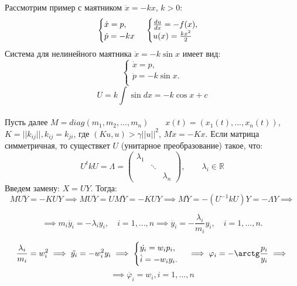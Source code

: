 \begin{example}
	Рассмотрим пример с маятником $\ddot{x}=-kx $, $k>0$:\\
	$$
		\begin{cases}		
			\dot{x}=p, \\
			\dot{p}=-kx \\
		\end{cases}\\
		\begin{cases}
			\frac{du}{dx}=-f(x),\\ 
			u(x)=\frac{k x^2}{2}
		\end{cases}	
	$$
	Система для нелинейного маятника $\ddot{x}=-k\sin x$ имеет вид:
	$$
		\begin{cases}
			\dot{x}=p, \\
			\dot{p}=-k\sin x.\\
		\end{cases}
	$$
	$$
		U=k \int{\sin dx}=-k \cos x+c
	$$\\
	Пусть далее $M=diag(m_1,m_2,...,m_n) \qquad x(t)=(x_1(t),...,x_n(t))$,  $K= ||k_{ij}||,  k_{ij}=k_{ji}$, где $(Ku, u)>\gamma {||u||}^2$, $M\ddot{x}=-Kx$. Если матрица симметричная, то существкет $U$ (унитарное преобразование) такое, что:
	$$
		U^tkU=\Lambda=
			\begin{pmatrix}
				\lambda_{1} & & \\
				& \ddots & \\
				& & \lambda_{n}
			\end{pmatrix}, \qquad \lambda_i \in \mathbb R
	$$
	Введем замену: $X=UY$. Тогда: 
	$$
		MU\ddot{Y}=-KUY \implies MU\ddot{Y}=UM\ddot{Y}=-KUY  \implies M\ddot{Y}=-(U^{-1}kU)Y=- \Lambda Y \implies
	$$
	
	$$
		\implies m_i\ddot{y_i}=-\lambda_iy_i, \quad i=1, ..., n \implies \ddot{y_i}=-\frac{\lambda_i}{m_i}y_i, \quad i=1, ..., n.
	$$
	
	$$
		\frac{\lambda_i}{m_i}=w_i^2 \implies \ddot{y_i}=-w_i^2y_i \implies 
		\begin{cases}
			\dot{y_i}=w_ip_i, \\
			\dot{i}=-w_iy_i. \\
		\end{cases}
		\implies \varphi_i=-\arctg \frac{p_i}{y_i} \implies
	$$
	$$
		\implies \dot{\varphi_i}=w_i, i=1, ..., n
	$$
	
\end{example}

